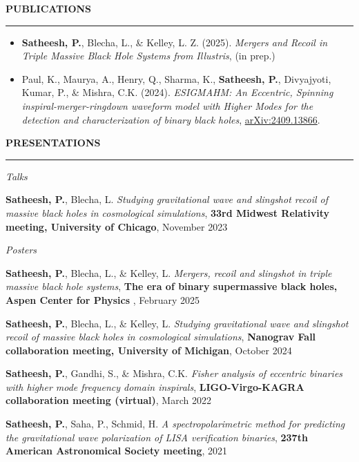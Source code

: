 \documentclass{resume} %
\renewenvironment{rSection}[1]{
\sectionskip
\textbf{\textcolor{C2}{\MakeUppercase{#1}}}
\sectionlineskip
\hrule
\begin{list}{}{
\setlength{\leftmargin}{1.5em}
}
\item[]
}{
\end{list}
}
\newcommand{\conference}[1]{\textcolor{C2}{\textbf{#1}}}
\begin{document}
\begin{rSection}{Publications}
\begin{itemize}
    \item \textbf{Satheesh, P.}, Blecha, L., \& Kelley, L. Z. (2025). \emph{Mergers and Recoil in Triple Massive Black Hole Systems from Illustris}, (in prep.)
    \item Paul, K., Maurya, A., Henry, Q., Sharma, K., \textbf{Satheesh, P.}, Divyajyoti, Kumar, P., \& Mishra, C.K. (2024). \emph{ESIGMAHM: An Eccentric, Spinning inspiral-merger-ringdown waveform model with Higher Modes for the detection and characterization of binary black holes}, \href{https://arxiv.org/abs/2409.13866}{arXiv:2409.13866}.
\end{itemize}

\end{rSection}

\begin{rSection}{Presentations}
    \begin{rSubsection}{\textit{Talks}}{}{}{}
        \item \textbf{Satheesh, P.}, Blecha, L. \emph{Studying gravitational wave and slingshot recoil of massive black holes in cosmological simulations}, \conference{33rd Midwest Relativity meeting, University of Chicago}, November 2023 
    \end{rSubsection}
    \begin{rSubsection}{\textit{Posters}}{}{}{}
        \item \textbf{Satheesh, P.}, Blecha, L., \& Kelley, L. \emph{Mergers, recoil and slingshot in triple massive black hole systems}, \conference{The era of binary supermassive black holes, Aspen Center for Physics} , February 2025
        \item \textbf{Satheesh, P.}, Blecha, L., \& Kelley, L. \emph{Studying gravitational wave and slingshot recoil of massive black holes in cosmological simulations}, \conference{Nanograv Fall collaboration meeting, University of Michigan}, October 2024
        \item \textbf{Satheesh, P.}, Gandhi, S., \& Mishra, C.K. \emph{Fisher analysis of eccentric binaries with higher mode frequency domain inspirals}, \conference{LIGO-Virgo-KAGRA collaboration meeting (virtual)},  March 2022 
        \item \textbf{Satheesh, P.}, Saha, P., Schmid, H. \emph{A spectropolarimetric method for predicting the gravitational wave polarization of LISA verification binaries}, \conference{237th American Astronomical Society meeting}, 2021
    \end{rSubsection}
\end{rSection}
\end{document}
